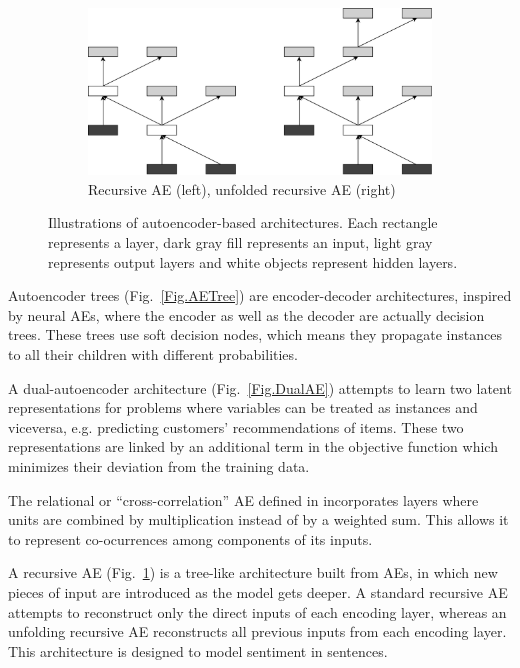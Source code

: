 \begin{figure}[ht!]
  \begin{subfigure}[t]{\figwidth}
    \centering
    \includegraphics[width=\figwidth]{ArchRecAE.pdf}
    \caption{\label{Fig.RecAE}Recursive AE (left), unfolded recursive AE (right)}
  \end{subfigure}
  \caption{\label{Fig.AEarch}Illustrations of autoencoder-based architectures. Each rectangle represents a layer, dark gray fill represents an input, light gray represents output layers and white objects represent hidden layers.}
  
\end{figure}

Autoencoder trees \cite{irsoy_unsupervised_2017} (Fig.~\ref{Fig.AETree}) are encoder-decoder architectures, inspired by neural AEs, where the encoder as well as the decoder are actually decision trees. These trees use soft decision nodes, which means they propagate instances to all their children with different probabilities. 

A dual-autoencoder architecture \cite{He2017} (Fig.~\ref{Fig.DualAE}) attempts to learn two latent representations for problems where variables can be treated as instances and viceversa, e.g. predicting customers' recommendations of items. These two representations are linked by an additional term in the objective function which minimizes their deviation from the training data.

The relational or ``cross-correlation'' AE defined in \cite{MemisevicRelational} incorporates layers where units are combined by multiplication instead of by a weighted sum. This allows it to represent co-ocurrences among components of its inputs.

A recursive AE \cite{RecursiveAE} (Fig.~\ref{Fig.RecAE}) is a tree-like architecture built from AEs, in which new pieces of input are introduced as the model gets deeper. A standard recursive AE attempts to reconstruct only the direct inputs of each encoding layer, whereas an unfolding recursive AE \cite{UnfoldingRecAE} reconstructs all previous inputs from each encoding layer. This architecture is designed to model sentiment in sentences.

